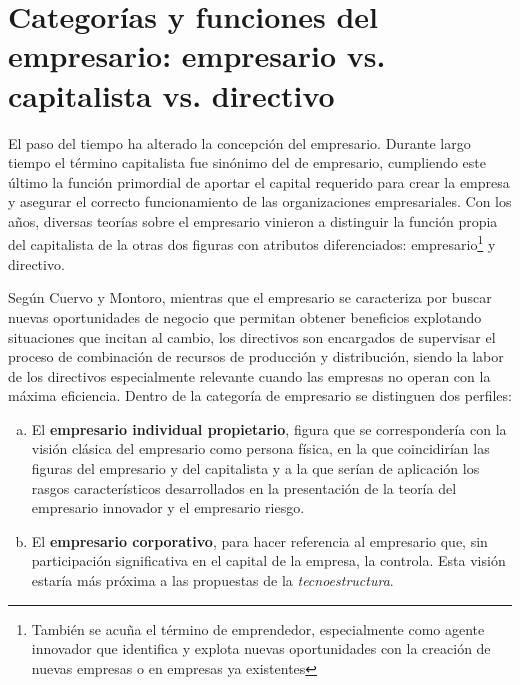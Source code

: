 \documentclass[12pt,a4paper,spanish]{report}
\begin{document}
	\section{\textcolor[rgb]{0.9,0.3,0.3}Categorías y funciones del empresario: empresario vs. capitalista vs. directivo}
		El paso del tiempo ha alterado la concepción del empresario. Durante largo tiempo el término capitalista fue sinónimo del de empresario, cumpliendo este último la función primordial de aportar el capital requerido para crear la empresa y asegurar el correcto funcionamiento de las organizaciones empresariales. Con los años, diversas teorías sobre el empresario vinieron a distinguir la función propia del capitalista de la otras dos figuras con atributos diferenciados: empresario\footnote{También se acuña el término de emprendedor, especialmente como agente innovador que identifica y explota nuevas oportunidades con la creación de nuevas empresas o en empresas ya existentes} y directivo.

		Según Cuervo y Montoro, mientras que el empresario se caracteriza por buscar nuevas oportunidades de negocio que permitan obtener beneficios explotando situaciones que incitan al cambio, los directivos son encargados de supervisar el proceso de combinación de recursos de producción y distribución, siendo la labor de los directivos especialmente relevante cuando las empresas no operan con la máxima eficiencia. Dentro de la categoría de empresario se distinguen dos perfiles:
		\begin{enumerate}[a)]
			\item El \textbf{empresario individual propietario}, figura que se correspondería con la visión clásica del empresario como persona física, en la que coincidirían las figuras del empresario y del capitalista y a la que serían de aplicación los rasgos característicos desarrollados en la presentación de la teoría del empresario innovador y el empresario riesgo.

			\item El \textbf{empresario corporativo}, para hacer referencia al empresario que, sin participación significativa en el capital de la empresa, la controla. Esta visión estaría más próxima a las propuestas de la \textcolor[rgb]{0.9,0.3,0.3}{\emph{tecnoestructura}}.
		\end{enumerate}
\end{document}
